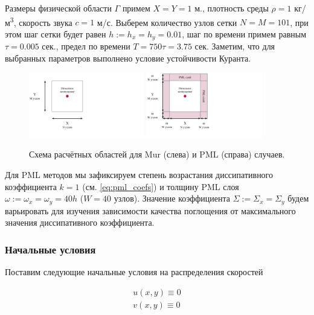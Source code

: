 Размеры физической области $\Gamma$ примем $X=Y=1$ м., плотность среды $\rho = 1$ кг/м\textsuperscript{3}, скорость звука $c=1$ м/с. Выберем количество узлов сетки $N=M=101$, при этом шаг сетки будет равен $h:=h_x=h_y=0.01$, шаг по времени примем равным $\tau = 0.005$ сек., предел по времени $T = 750\tau = 3.75$ сек. Заметим, что для выбранных параметров выполнено условие устойчивости Куранта.

\begin{figure}[H]
    \centering
    \includegraphics[trim={0px 70px 435px 0px},clip,width=0.45\textwidth]{images/pml/exp_mur_scheme.png}
    \includegraphics[trim={0px 70px 435px 0px},clip,width=0.45\textwidth]{images/pml/exp_pml_scheme.png}
    \caption{Схема расчётных областей для Mur (слева) и PML (справа) случаев.}
    \label{fig:experiment_scheme}
\end{figure}

Для PML методов мы зафиксируем степень возрастания диссипативного коэффициента $k=1$ (см. \eqref{eq:pml_coefs}) и  толщину PML слоя $\omega := \omega_x = \omega_y = 40 h$ ($W=40$ узлов). Значение коэффициента $\Sigma:=\Sigma_x = \Sigma_y$ будем варьировать для изучения зависимости качества поглощения от максимального значения диссипативного коэффициента.

\subsubsection{Начальные условия}

Поставим следующие начальные условия на распределения скоростей

\begin{equation}
\begin{gathered}
    u(x,y) \equiv 0 \\
    v(x,y) \equiv 0
\end{gathered}
\end{equation}

